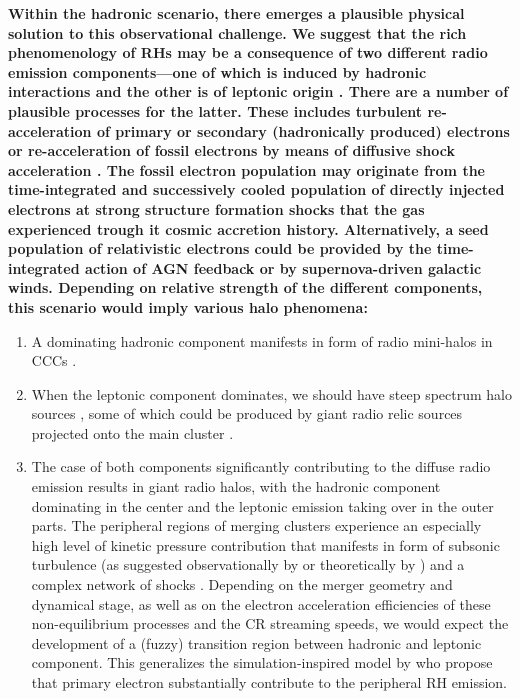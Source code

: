 \documentclass[useAMS,usenatbib]{mn2e}
\begin{document}
{\bf Within the hadronic scenario, there emerges a plausible physical solution
  to this observational challenge. We suggest that the rich phenomenology of RHs
  may be a consequence of two different radio emission components---one of which
  is induced by hadronic interactions and the other is of leptonic origin
  \citep{2008MNRAS.385.1211P}.  There are a number of plausible processes for
  the latter.  These includes turbulent re-acceleration of primary or secondary
  (hadronically produced) electrons \citep{2010arXiv1008.0184B} or
  re-acceleration of fossil electrons by means of diffusive shock acceleration
  \citep{kang11,kang12,pinzke13}. The fossil electron population may originate
  from the time-integrated and successively cooled population of directly
  injected electrons at strong structure formation shocks that the gas
  experienced trough it cosmic accretion history. Alternatively, a seed
  population of relativistic electrons could be provided by the time-integrated
  action of AGN feedback or by supernova-driven galactic winds.  Depending on
  relative strength of the different components, this scenario would imply
  various halo phenomena:}
\begin{enumerate}
\item A dominating hadronic component  manifests in form of radio mini-halos in
  CCCs \citep{2004A&A...413...17P}.
\item When the leptonic component dominates, we should have steep spectrum halo
  sources \citep[such as A520,][]{2008Natur.455..944B}, some of which could be
  produced by giant radio relic sources projected onto the main cluster
  \citep{2012arXiv1211.3122S}.
\item The case of both components significantly contributing to the diffuse
  radio emission results in giant radio halos, with the hadronic component
  dominating in the center and the leptonic emission taking over in the outer
  parts. The peripheral regions of merging clusters experience an especially
  high level of kinetic pressure contribution \citep{2009ApJ...705.1129L,
    2012ApJ...758...74B} that manifests in form of subsonic turbulence (as
  suggested observationally by \citealp{2004A&A...426..387S} or theoretically by
  \citealp{2006MNRAS.366.1437S,2005MNRAS.364..753D, 2008Sci...320..909R}) and a
  complex network of shocks \citep{2003ApJ...593..599R, 2006MNRAS.367..113P,
    2008MNRAS.385.1211P, 2008ApJ...689.1063S, 2009MNRAS.395.1333V}. Depending on
  the merger geometry and dynamical stage, as well as on the electron
  acceleration efficiencies of these non-equilibrium processes and the CR
  streaming speeds, we would expect the development of a (fuzzy) transition
  region between hadronic and leptonic component. This generalizes the
  simulation-inspired model by \cite{2008MNRAS.385.1211P} who propose that
  primary electron substantially contribute to the peripheral RH emission.
\end{enumerate}
\end{document}
